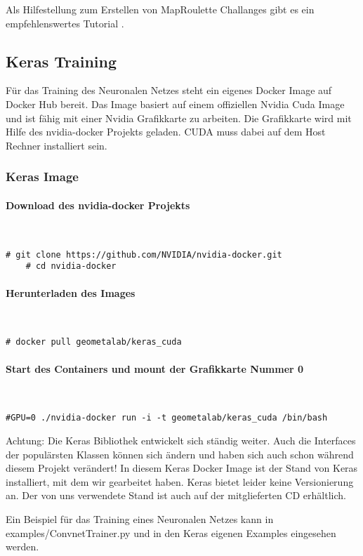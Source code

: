 Als Hilfestellung zum Erstellen von MapRoulette Challanges gibt es ein empfehlenswertes Tutorial \cite{Tutorial}.

\newpage
\subsection{Keras Training}
Für das Training des Neuronalen Netzes steht ein eigenes Docker Image \cite{DokerKeras} auf Docker Hub bereit. Das Image basiert auf einem offiziellen Nvidia Cuda Image und ist fähig mit einer Nvidia Grafikkarte zu arbeiten. Die Grafikkarte wird mit Hilfe des nvidia-docker Projekts geladen. CUDA muss dabei auf dem Host Rechner installiert sein.


\subsubsection{Keras Image}
\paragraph{Download des nvidia-docker Projekts}\mbox{}\\
\begin{lstlisting}[style=BashInputStyle]
	# git clone https://github.com/NVIDIA/nvidia-docker.git
	# cd nvidia-docker
\end{lstlisting}

\paragraph{Herunterladen des Images}\mbox{}\\
\begin{lstlisting}[style=BashInputStyle]
	# docker pull geometalab/keras_cuda
\end{lstlisting}

\paragraph{Start des Containers und mount der Grafikkarte Nummer 0}\mbox{}\\
\begin{lstlisting}[style=BashInputStyle]
	#GPU=0 ./nvidia-docker run -i -t geometalab/keras_cuda /bin/bash
\end{lstlisting}

Achtung: Die Keras Bibliothek entwickelt sich ständig weiter. Auch die Interfaces der populärsten Klassen können sich ändern und haben sich auch schon während diesem Projekt verändert! In diesem Keras Docker Image ist der Stand von Keras installiert, mit dem wir gearbeitet haben. Keras bietet leider keine Versionierung an. Der von uns verwendete Stand ist auch auf der mitglieferten CD erhältlich.

Ein Beispiel für das Training eines Neuronalen Netzes kann in examples/ConvnetTrainer.py und in den Keras eigenen Examples eingesehen werden.